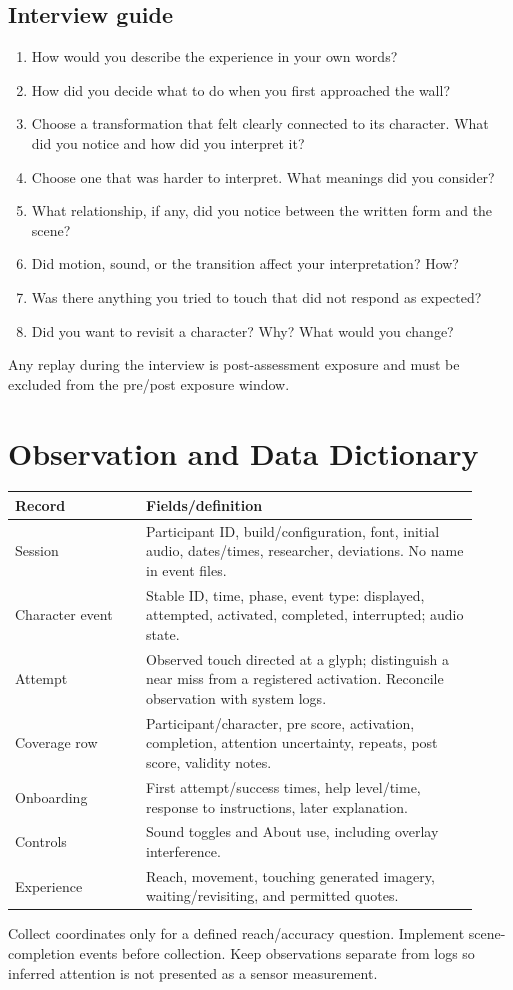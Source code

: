 \documentclass[11pt,letterpaper]{article}
\begin{document}
\subsection{Interview guide}
\begin{enumerate}
\item How would you describe the experience in your own words?
\item How did you decide what to do when you first approached the wall?
\item Choose a transformation that felt clearly connected to its character. What did you notice and how did you interpret it?
\item Choose one that was harder to interpret. What meanings did you consider?
\item What relationship, if any, did you notice between the written form and the scene?
\item Did motion, sound, or the transition affect your interpretation? How?
\item Was there anything you tried to touch that did not respond as expected?
\item Did you want to revisit a character? Why? What would you change?
\end{enumerate}
Any replay during the interview is post-assessment exposure and must be excluded from the pre/post exposure window.

\section{Observation and Data Dictionary}
\begin{longtable}{p{0.26\linewidth}p{0.66\linewidth}}
\toprule Record & Fields/definition \\
\midrule\endhead
Session & Participant ID, build/configuration, font, initial audio, dates/times, researcher, deviations. No name in event files. \\
Character event & Stable ID, time, phase, event type: displayed, attempted, activated, completed, interrupted; audio state. \\
Attempt & Observed touch directed at a glyph; distinguish a near miss from a registered activation. Reconcile observation with system logs. \\
Coverage row & Participant/character, pre score, activation, completion, attention uncertainty, repeats, post score, validity notes. \\
Onboarding & First attempt/success times, help level/time, response to instructions, later explanation. \\
Controls & Sound toggles and About use, including overlay interference. \\
Experience & Reach, movement, touching generated imagery, waiting/revisiting, and permitted quotes. \\
\bottomrule
\end{longtable}
Collect coordinates only for a defined reach/accuracy question. Implement scene-completion events before collection. Keep observations separate from logs so inferred attention is not presented as a sensor measurement.
\end{document}
